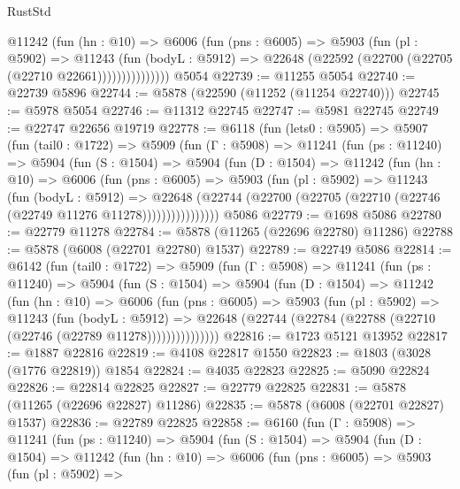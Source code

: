 \begin{lexlean}{RustStd}
\begin{coremodule}
                @11242
                  (fun (hn : @10) =>
                  @6006
                    (fun (pns : @6005) =>
                    @5903
                      (fun (pl : @5902) =>
                      @11243
                        (fun (bodyL : @5912) =>
                        @22648 (@22592 (@22700 (@22705 (@22710 @22661)))))))))))))))
    @5054
@22739 := @11255 @5054
@22740 := @22739 @5896
@22744 := @5878 (@22590 (@11252 (@11254 @22740)))
@22745 := @5978 @5054
@22746 := @11312 @22745
@22747 := @5981 @22745
@22749 := @22747 @22656 @19719
@22778 := @6118
    (fun (lets0 : @5905) =>
    @5907
      (fun (tail0 : @1722) =>
      @5909
        (fun (Γ : @5908) =>
        @11241
          (fun (ps : @11240) =>
          @5904
            (fun (S : @1504) =>
            @5904
              (fun (D : @1504) =>
              @11242
                (fun (hn : @10) =>
                @6006
                  (fun (pns : @6005) =>
                  @5903
                    (fun (pl : @5902) =>
                    @11243
                      (fun (bodyL : @5912) =>
                      @22648
                        (@22744
                          (@22700 (@22705 (@22710 (@22746 (@22749 @11276 @11278))))))))))))))))
    @5086
@22779 := @1698 @5086
@22780 := @22779 @11278
@22784 := @5878 (@11265 (@22696 @22780) @11286)
@22788 := @5878 (@6008 (@22701 @22780) @1537)
@22789 := @22749 @5086
@22814 := @6142
    (fun (tail0 : @1722) =>
    @5909
      (fun (Γ : @5908) =>
      @11241
        (fun (ps : @11240) =>
        @5904
          (fun (S : @1504) =>
          @5904
            (fun (D : @1504) =>
            @11242
              (fun (hn : @10) =>
              @6006
                (fun (pns : @6005) =>
                @5903
                  (fun (pl : @5902) =>
                  @11243
                    (fun (bodyL : @5912) =>
                    @22648 (@22744 (@22784 (@22788 (@22710 (@22746 (@22789 @11278)))))))))))))))
@22816 := @1723 @5121 @13952
@22817 := @1887 @22816
@22819 := @4108 @22817 @1550
@22823 := @1803 (@3028 (@1776 @22819)) @1854
@22824 := @4035 @22823
@22825 := @5090 @22824
@22826 := @22814 @22825
@22827 := @22779 @22825
@22831 := @5878 (@11265 (@22696 @22827) @11286)
@22835 := @5878 (@6008 (@22701 @22827) @1537)
@22836 := @22789 @22825
@22858 := @6160
    (fun (Γ : @5908) =>
    @11241
      (fun (ps : @11240) =>
      @5904
        (fun (S : @1504) =>
        @5904
          (fun (D : @1504) =>
          @11242
            (fun (hn : @10) =>
            @6006
              (fun (pns : @6005) =>
              @5903
                (fun (pl : @5902) =>

\end{coremodule}
\end{lexlean}
